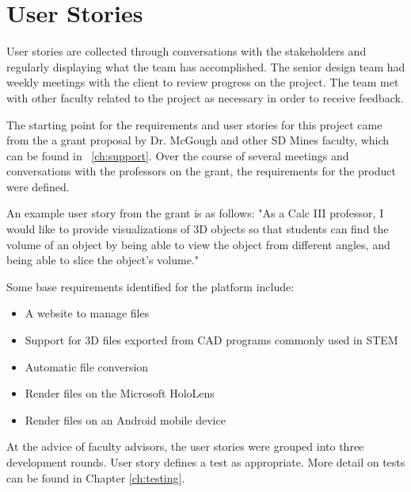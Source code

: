 \section{User Stories}

User stories are collected through conversations with the stakeholders and
regularly displaying what the team has accomplished. The senior design team had
weekly meetings with the client to review progress on the project. The team met
with other faculty related to the project as necessary in order to receive
feedback.

The starting point for the requirements and user stories for this project came
from the a grant proposal by Dr. McGough and other SD Mines faculty,
which can be found in ~\autoref{ch:support}. Over the course of several
meetings and conversations with the professors on the grant, the
requirements for the product were defined.

An example user story from the grant is as follows: "As a Calc III
professor, I would like to provide visualizations of 3D objects so that
students can find the volume of an object by being able to view the object
from different angles, and being able to slice the object's volume."

Some base requirements identified for the platform include:
\begin{itemize}
	\item A website to manage files
	\item Support for 3D files exported from CAD programs commonly used in STEM
	\item Automatic file conversion
	\item Render files on the Microsoft HoloLens
	\item Render files on an Android mobile device
\end{itemize}

At the advice of faculty advisors, the user stories were grouped into three 
development rounds. User story defines a test as appropriate. More detail on tests can be found in Chapter \ref{ch:testing}.



